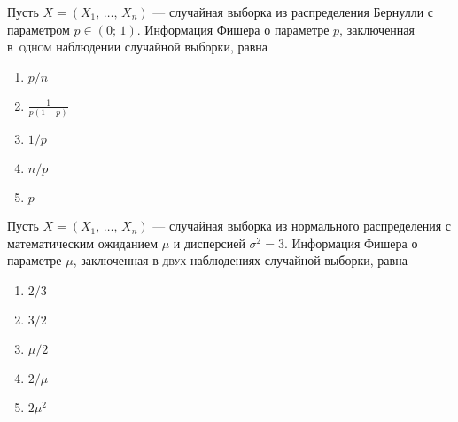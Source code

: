\documentclass[t]{beamer}
\begin{document}
 \begin{frame} \label{22} 
\begin{block}{22} 

  Пусть $X = (X_1, \, \ldots, \, X_n)$ — случайная выборка из распределения Бернулли с параметром $p \in (0;\,1)$. Информация Фишера о параметре $p$, заключенная в~\textsc{одном} наблюдении случайной выборки, равна


 \end{block} 
\begin{enumerate} 
\item[] \hyperlink{22-No}{\beamergotobutton{} $p/n$}
\item[] \hyperlink{22-Yes}{\beamergotobutton{} $\frac{1}{p(1-p)}$}
\item[] \hyperlink{22-No}{\beamergotobutton{} $1/p$}
\item[] \hyperlink{22-No}{\beamergotobutton{} $n/p$}
\item[] \hyperlink{22-No}{\beamergotobutton{} $p$}
\end{enumerate} 
\end{frame} 


 \begin{frame} \label{23} 
\begin{block}{23} 

  Пусть $X = (X_1, \, \ldots, \, X_n)$ — случайная выборка из нормального распределения с математическим ожиданием $\mu$ и дисперсией $\sigma^2 = 3$. Информация Фишера о параметре $\mu$, заключенная в \textsc{двух} наблюдениях случайной выборки, равна


 \end{block} 
\begin{enumerate} 
\item[] \hyperlink{23-Yes}{\beamergotobutton{} $2 / 3$}
\item[] \hyperlink{23-No}{\beamergotobutton{} $3 / 2$}
\item[] \hyperlink{23-No}{\beamergotobutton{} $\mu / 2$}
\item[] \hyperlink{23-No}{\beamergotobutton{} $2 / \mu$}
\item[] \hyperlink{23-No}{\beamergotobutton{} $2 \mu^2$}
\end{enumerate} 
\end{frame} 
\end{document}
